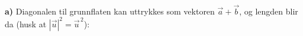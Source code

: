 \\
\textbf{a)} Diagonalen til grunnflaten kan uttrykkes som vektoren $ \vec{a}+\vec{b} $, og lengden blir da (husk at $ |\vec{u}|^2 = \vec{u}^{\,2} $):
